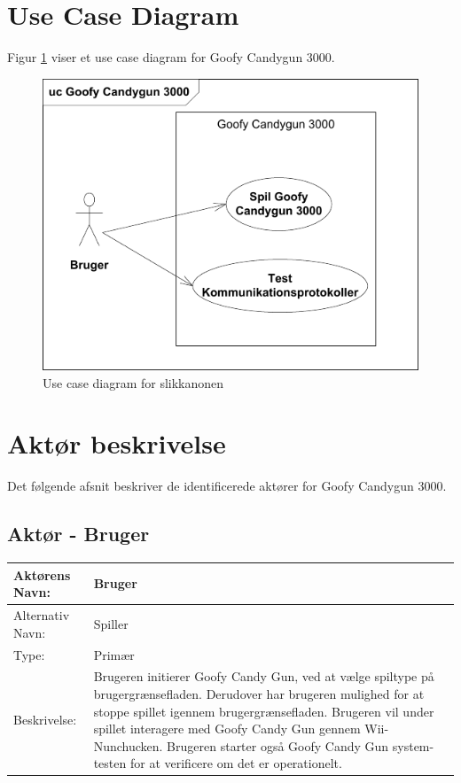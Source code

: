 \section{Use Case Diagram}
Figur \ref{ref:usecaseDiagram} viser et use case diagram for Goofy Candygun 3000.
\begin{figure}[H]
	\centering
	\includegraphics[width = \textwidth]{Kravspecifikation/images/usecaseDiagram}
	\caption{Use case diagram for slikkanonen}
	\label{ref:usecaseDiagram}
\end{figure}

\section{Aktør beskrivelse}
Det følgende afsnit beskriver de identificerede aktører for Goofy Candygun 3000.

\subsection{Aktør - Bruger}

\begin{tabularx}{\textwidth}{| p{2cm} | p{9.1cm} |}
	\hline
	Aktørens Navn: & Bruger \\ 
	\hline
	Alternativ Navn: & Spiller \\
	\hline
	Type: & Primær \\
	\hline
	Beskrivelse: & Brugeren initierer Goofy Candy Gun, ved at vælge spiltype på brugergrænsefladen. Derudover har brugeren mulighed for at stoppe spillet igennem brugergrænsefladen. Brugeren vil under spillet interagere med Goofy Candy Gun gennem Wii-Nunchucken. \newline
	Brugeren starter også Goofy Candy Gun system-testen for at verificere om det er operationelt. \\
	\hline
\end{tabularx}

